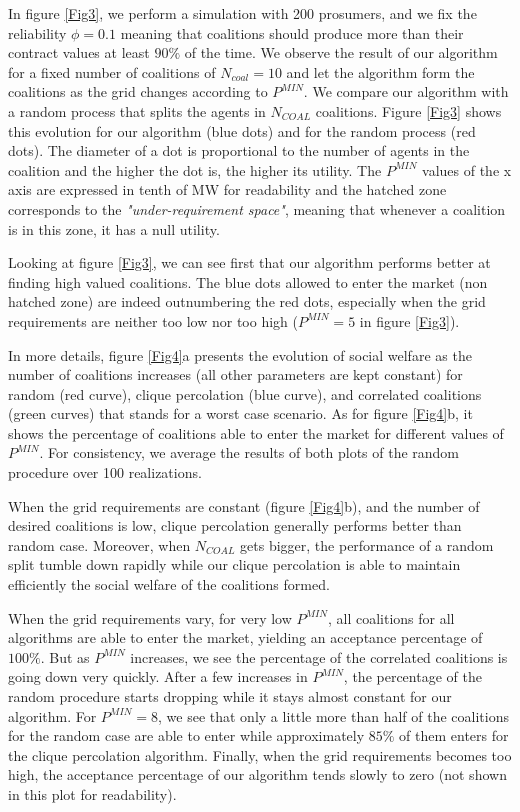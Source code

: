 \documentclass[conference]{IEEEtran}
\begin{document}
In figure \ref{Fig3}, we perform a simulation with 200 prosumers, and we fix the reliability $ \phi = 0.1 $ meaning that coalitions should produce more than their contract values at least $ 90 \% $ of the time. We observe the result of our algorithm for a fixed number of coalitions of $N_{coal} = 10$ and let the algorithm form the coalitions as the grid changes according to $ P^{MIN} $. We compare our algorithm with a random process that splits the agents in $ N_{COAL} $ coalitions. Figure \ref{Fig3} shows this evolution for our algorithm (blue dots) and for the random process (red dots). The diameter of a dot is proportional to the number of agents in the coalition and the higher the dot is, the higher its utility. The $ P^{MIN} $ values of the x axis are expressed in tenth of MW for readability and the hatched zone corresponds to the \textit{"under-requirement space"}, meaning that whenever a coalition is in this zone, it has a null utility. 

Looking at figure \ref{Fig3}, we can see first that our algorithm performs better at finding high valued coalitions. The blue dots allowed to enter the market (non hatched zone) are indeed outnumbering the red dots, especially when the grid requirements are neither too low nor too high ($ P^{MIN} = 5 $ in figure \ref{Fig3}).

In more details, figure \ref{Fig4}a presents the evolution of social welfare as the number of coalitions increases (all other parameters are kept constant) for random (red curve), clique percolation (blue curve), and correlated coalitions (green curves) that stands for a worst case scenario. As for figure \ref{Fig4}b, it shows the percentage of coalitions able to enter the market for different values of $ P^{MIN} $. For consistency, we average the results of both plots of the random procedure over 100 realizations.

When the grid requirements are constant (figure \ref{Fig4}b), and the number of desired coalitions is low, clique percolation generally performs better than random case. Moreover, when $ N_{COAL} $ gets bigger, the performance of a random split tumble down rapidly while our clique percolation is able to maintain efficiently the social welfare of the coalitions formed.

When the grid requirements vary, for very low $ P^{MIN} $, all coalitions for all algorithms are able to enter the market, yielding an acceptance percentage of $ 100 \% $. But as $ P^{MIN} $ increases, we see the percentage of the correlated coalitions is going down very quickly. After a few increases in $ P^{MIN} $, the percentage of the random procedure starts dropping while it stays almost constant for our algorithm. For $ P^{MIN} = 8 $, we see that only a little more than half of the coalitions for the random case are able to enter while approximately $ 85 \%$ of them enters for the clique percolation algorithm. Finally, when the grid requirements becomes too high, the acceptance percentage of our algorithm tends slowly to zero (not shown in this plot for readability).
\end{document}
